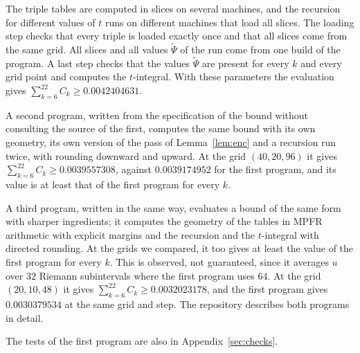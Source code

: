 \documentclass[11pt]{amsart}
\theoremstyle{definition}
\theoremstyle{remark}
\numberwithin{equation}{section}
\newcommand{\WindowThree}{0.0042404631}%
\newcommand{\KmaxW}{22}
\newcommand{\Wsecond}{0.0039557308}\newcommand{\Wsecondgrid}{(40,20,96)}\newcommand{\Wsecondmain}{0.0039174952}%
\newcommand{\Wind}{0.0032023178}\newcommand{\Windgrid}{(20,10,48)}\newcommand{\Windmain}{0.0030379534}%
\newcommand{\Kmax}{\KmaxW}
\newcommand{\LargeSum}{\WindowThree}
\begin{document}
The triple tables are computed in slices on several machines, and the recursion for different values of $t$ runs on different machines that load all slices. The loading step checks that every triple is loaded exactly once and that all slices come from the same grid. All slices and all values $\tilde\Psi$ of the run come from one build of the program. A last step checks that the values $\tilde\Psi$ are present for every $k$ and every grid point and computes the $t$-integral. With these parameters the evaluation gives $\sum_{k=6}^{\Kmax}C_k\ge\LargeSum$.

A second program, written from the specification of the bound without consulting the source of the first, computes the same bound with its own geometry, its own version of the pass of Lemma~\ref{lem:enc} and a recursion run twice, with rounding downward and upward. At the grid $\Wsecondgrid$ it gives $\sum_{k=6}^{\Kmax}C_k\ge\Wsecond$, against $\Wsecondmain$ for the first program, and its value is at least that of the first program for every $k$.

A third program, written in the same way, evaluates a bound of the same form with sharper ingredients; it computes the geometry of the tables in MPFR arithmetic with explicit margins and the recursion and the $t$-integral with directed rounding. At the grids we compared, it too gives at least the value of the first program for every $k$. This is observed, not guaranteed, since it averages $u$ over $32$ Riemann subintervals where the first program uses $64$. At the grid $\Windgrid$ it gives $\sum_{k=6}^{\Kmax}C_k\ge\Wind$, and the first program gives $\Windmain$ at the same grid and step. The repository describes both programs in detail.

The tests of the first program are also in Appendix~\ref{sec:checks}.
\end{document}
